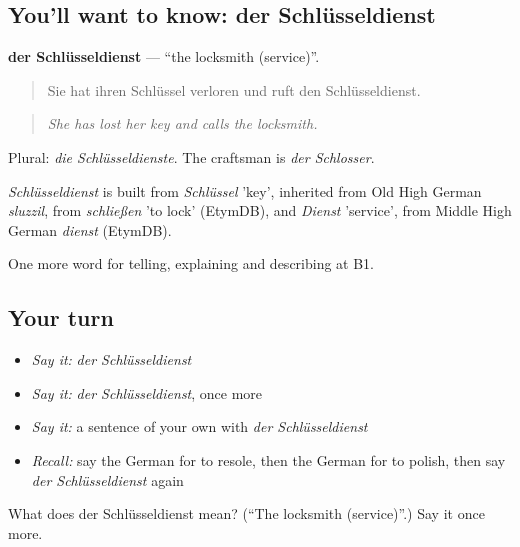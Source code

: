 \subsection*{You'll want to know: der Schlüsseldienst}
\textbf{der Schlüsseldienst} — \textquotedblleft{}the locksmith (service)\textquotedblright{}.

\begin{quote}
Sie hat ihren Schlüssel verloren und ruft den Schlüsseldienst.
\end{quote}

\begin{quote}
\emph{She has lost her key and calls the locksmith.}
\end{quote}

Plural: \emph{die Schlüsseldienste}. The craftsman is \emph{der Schlosser}.

\begin{cousinweb}
\emph{Schlüsseldienst} is built from \emph{Schlüssel} 'key', inherited from Old High German \emph{sluzzil}, from \emph{schließen} 'to lock' (EtymDB), and \emph{Dienst} 'service', from Middle High German \emph{dienst} (EtymDB).
\end{cousinweb}

\begin{grammarlens}[title={What you've built}]
One more word for telling, explaining and describing at B1.
\end{grammarlens}

\subsection*{Your turn}
\begin{itemize}
\raggedright
  \item \emph{Say it:} \emph{der Schlüsseldienst}
  \item \emph{Say it:} \emph{der Schlüsseldienst}, once more
  \item \emph{Say it:} a sentence of your own with \emph{der Schlüsseldienst}
  \item \emph{Recall:} say the German for to resole, then the German for to polish, then say \emph{der Schlüsseldienst} again
\end{itemize}

\begin{tcolorbox}[breakable,colback=teal!4,colframe=teal!35!black,title={Before you move on}]
What does der Schlüsseldienst mean? (\textquotedblleft{}The locksmith (service)\textquotedblright{}.) Say it once more.
\end{tcolorbox}
